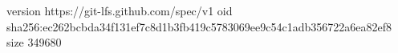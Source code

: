 version https://git-lfs.github.com/spec/v1
oid sha256:ec262bcbda34f131ef7c8d1b3fb419c5783069ee9c54c1adb356722a6ea82ef8
size 349680
